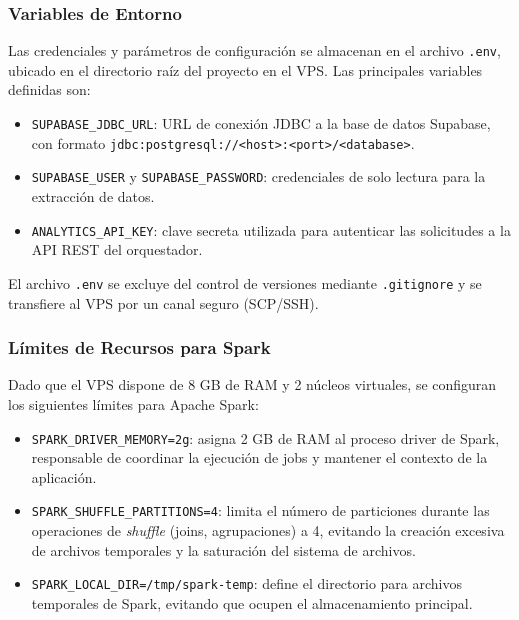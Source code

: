 \subsubsection{Variables de Entorno}

Las credenciales y parámetros de configuración se almacenan en el
archivo \texttt{.env}, ubicado en el directorio raíz del proyecto en
el VPS. Las principales variables definidas son:

\begin{itemize}[leftmargin=1.5em]
  \item \texttt{SUPABASE\_JDBC\_URL}: URL de conexión JDBC a la base
  de datos Supabase, con formato
  \texttt{jdbc:postgresql://<host>:<port>/<database>}.
  \item \texttt{SUPABASE\_USER} y \texttt{SUPABASE\_PASSWORD}:
  credenciales de solo lectura para la extracción de datos.
  \item \texttt{ANALYTICS\_API\_KEY}: clave secreta utilizada para
  autenticar las solicitudes a la API REST del orquestador.
\end{itemize}

El archivo \texttt{.env} se excluye del control de versiones mediante
\texttt{.gitignore} y se transfiere al VPS por un canal seguro
(SCP/SSH).

\subsubsection{Límites de Recursos para Spark}

Dado que el VPS dispone de 8 GB de RAM y 2 núcleos virtuales, se
configuran los siguientes límites para Apache Spark:

\begin{itemize}[leftmargin=1.5em]
  \item \texttt{SPARK\_DRIVER\_MEMORY=2g}: asigna 2 GB de RAM al
  proceso driver de Spark, responsable de coordinar la ejecución de
  jobs y mantener el contexto de la aplicación.
  \item \texttt{SPARK\_SHUFFLE\_PARTITIONS=4}: limita el número de
  particiones durante las operaciones de \textit{shuffle} (joins,
  agrupaciones) a 4, evitando la creación excesiva de archivos
  temporales y la saturación del sistema de archivos.
  \item \texttt{SPARK\_LOCAL\_DIR=/tmp/spark-temp}: define el
  directorio para archivos temporales de Spark, evitando que ocupen
  el almacenamiento principal.
\end{itemize}

